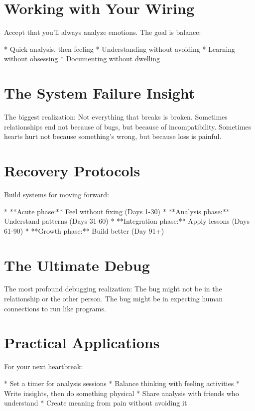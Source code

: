 \documentclass[12pt,oneside]{book}
\begin{document}
\section{Working with Your Wiring}

Accept that you'll always analyze emotions. The goal is balance:

                    * Quick analysis, then feeling
                    * Understanding without avoiding
                    * Learning without obsessing
                    * Documenting without dwelling

\section{The System Failure Insight}

The biggest realization: Not everything that breaks is broken. Sometimes relationships end not because of bugs, but because of incompatibility. Sometimes hearts hurt not because something's wrong, but because loss is painful.

\section{Recovery Protocols}

Build systems for moving forward:

                    * **Acute phase:** Feel without fixing (Days 1-30)
                    * **Analysis phase:** Understand patterns (Days 31-60)
                    * **Integration phase:** Apply lessons (Days 61-90)
                    * **Growth phase:** Build better (Day 91+)

\section{The Ultimate Debug}

The most profound debugging realization: The bug might not be in the relationship or the other person. The bug might be in expecting human connections to run like programs.

\section{Practical Applications}

For your next heartbreak:

                    * Set a timer for analysis sessions
                    * Balance thinking with feeling activities
                    * Write insights, then do something physical
                    * Share analysis with friends who understand
                    * Create meaning from pain without avoiding it
\end{document}
